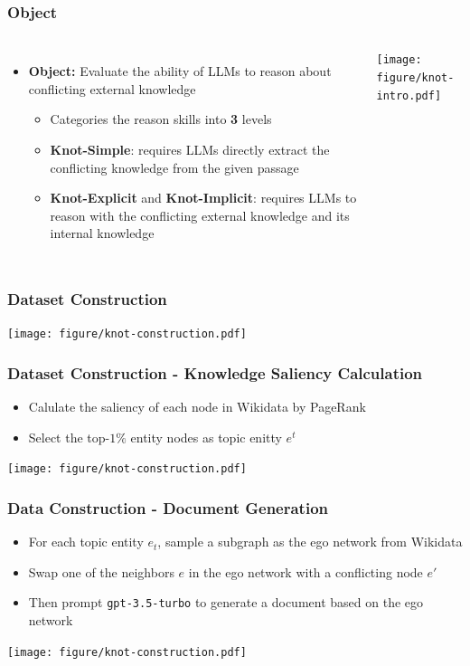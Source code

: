 \documentclass{beamer}
\begin{document}
\begin{frame}
\frametitle{Object}
\begin{columns}[t]
    \begin{itemize}
        \item \textbf{Object:} Evaluate the ability of LLMs to reason about conflicting external knowledge
        \begin{itemize}
            \item Categories the reason skills into \textbf{3} levels
            \item \textbf{Knot-Simple}: requires LLMs directly extract the conflicting knowledge from the given passage
            \item \textbf{Knot-Explicit} and \textbf{Knot-Implicit}: requires LLMs to reason with the conflicting external knowledge and its internal knowledge
        \end{itemize}
    \end{itemize}
    \vspace*{-2.35cm}
    \begin{center}
        \texttt{[image: figure/knot-intro.pdf]}
    \end{center}
\end{columns}
\end{frame}


\begin{frame}
\frametitle{Dataset Construction}
\begin{center}
    \texttt{[image: figure/knot-construction.pdf]}
\end{center}
\end{frame}


\begin{frame}
    \frametitle{Dataset Construction - Knowledge Saliency Calculation}
    \begin{itemize}
        \item Calulate the saliency of each node in Wikidata by PageRank
        \item Select the top-$1\%$ entity nodes as topic enitty $e^t$ 
    \end{itemize}
    \begin{center}
        \texttt{[image: figure/knot-construction.pdf]}
    \end{center}
\end{frame}

\begin{frame}
    \frametitle{Data Construction - Document Generation}
    \begin{itemize}
        \item For each topic entity $e_t$, sample a subgraph as the ego network from Wikidata
        \item Swap one of the neighbors $e$ in the ego network with a conflicting node $e'$ 
        \item Then prompt \texttt{gpt-3.5-turbo} to generate a document based on the ego network
    \end{itemize}
    \begin{center}
        \texttt{[image: figure/knot-construction.pdf]}
    \end{center}
\end{frame}
\end{document}
